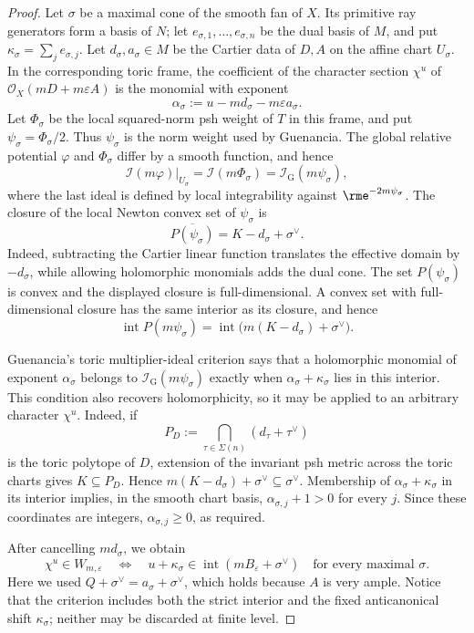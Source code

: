 \begin{proof}
Let $\sigma$ be a maximal cone of the smooth fan of $X$.  Its primitive
ray generators form a basis of $N$; let
$e_{\sigma,1},\ldots,e_{\sigma,n}$ be the dual basis of $M$, and put
$\kappa_\sigma=\sum_j e_{\sigma,j}$.  Let
$d_\sigma,a_\sigma\in M$ be the Cartier data of $D,A$ on the affine chart
$U_\sigma$.  In the corresponding toric frame, the coefficient of the
character section $\chi^u$ of
$\mathcal O_X(mD+m\varepsilon A)$ is the monomial with exponent
\[
       \alpha_\sigma:=u-m d_\sigma-m\varepsilon a_\sigma.
\]
Let $\Phi_\sigma$ be the local squared-norm psh weight of $T$ in this
frame, and put $\psi_\sigma=\Phi_\sigma/2$.  Thus $\psi_\sigma$ is the
norm weight used by Guenancia.  The global relative potential $\varphi$
and $\Phi_\sigma$ differ by a smooth function, and hence
\[
 \mathcal I(m\varphi)|_{U_\sigma}
   =\mathcal I(m\Phi_\sigma)
   =\mathcal I_{\mathrm G}(m\psi_\sigma),
\]
where the last ideal is defined by local integrability against
$\rme^{-2m\psi_\sigma}$.  The closure of the local Newton convex set of
$\psi_\sigma$ is
\[
              \overline{P(\psi_\sigma)}
                    =K-d_\sigma+\sigma^\vee.
\]
Indeed, subtracting the Cartier linear function translates the effective
domain by $-d_\sigma$, while allowing holomorphic monomials adds the dual
cone.  The set $P(\psi_\sigma)$ is convex and the displayed closure is
full-dimensional.  A convex set with full-dimensional closure has the same
interior as its closure, and hence
\[
 \operatorname{int}P(m\psi_\sigma)
   =\operatorname{int}\bigl(m(K-d_\sigma)+\sigma^\vee\bigr).
\]

Guenancia's toric multiplier-ideal criterion
\cite[Theorem~1.13]{Guenancia12} says that a holomorphic monomial of exponent
$\alpha_\sigma$ belongs to $\mathcal I_{\mathrm G}(m\psi_\sigma)$
exactly when $\alpha_\sigma+\kappa_\sigma$ lies in this interior.  This
condition also recovers holomorphicity, so it may be applied to an arbitrary
character $\chi^u$.  Indeed, if
\[
 P_D:=\bigcap_{\tau\in\Sigma(n)}(d_\tau+\tau^\vee)
\]
is the toric polytope of $D$, extension of the invariant psh metric across
the toric charts gives $K\subseteq P_D$.  Hence
$m(K-d_\sigma)+\sigma^\vee\subseteq\sigma^\vee$.  Membership of
$\alpha_\sigma+\kappa_\sigma$ in its interior implies, in the smooth chart
basis, $\alpha_{\sigma,j}+1>0$ for every $j$.  Since these coordinates
are integers, $\alpha_{\sigma,j}\geq0$, as required.

After cancelling $m d_\sigma$, we obtain
\[
 \chi^u\in W_{m,\varepsilon}
 \quad\Longleftrightarrow\quad
 u+\kappa_\sigma\in
 \operatorname{int}(mB_\varepsilon+\sigma^\vee)
 \quad\text{for every maximal }\sigma.
\]
Here we used
$Q+\sigma^\vee=a_\sigma+\sigma^\vee$, which holds because $A$ is
very ample.  Notice that the criterion includes both the strict interior and
the fixed anticanonical shift $\kappa_\sigma$; neither may be discarded at
finite level.


\end{proof}

